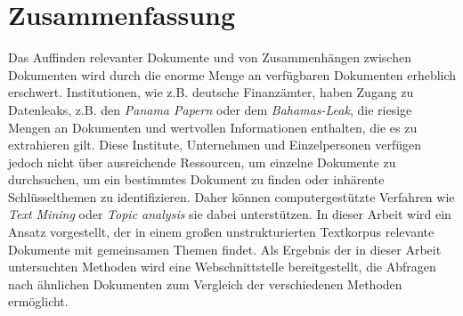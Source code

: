 \chapter*{Zusammenfassung}

Das Auffinden relevanter Dokumente und von Zusammenhängen zwischen Dokumenten wird durch die enorme Menge an verfügbaren Dokumenten erheblich erschwert.
Institutionen, wie z.B. deutsche Finanzämter, haben Zugang zu Datenleaks, z.B. den \textit{Panama Papern} oder dem \textit{Bahamas-Leak}, 
die riesige Mengen an Dokumenten und wertvollen Informationen enthalten, die es zu extrahieren gilt.
Diese Institute, Unternehmen und Einzelpersonen verfügen jedoch nicht über ausreichende Ressourcen, um einzelne Dokumente 
zu durchsuchen, um ein bestimmtes Dokument zu finden oder inhärente Schlüsselthemen zu identifizieren.
Daher können computergestützte Verfahren wie \textit{Text Mining} oder \textit{Topic analysis} sie dabei unterstützen.
In dieser Arbeit wird ein Ansatz vorgestellt, der in einem großen unstrukturierten Textkorpus relevante Dokumente mit gemeinsamen Themen findet.
Als Ergebnis der in dieser Arbeit untersuchten Methoden wird eine Webschnittstelle bereitgestellt, die Abfragen nach ähnlichen Dokumenten 
zum Vergleich der verschiedenen Methoden ermöglicht.